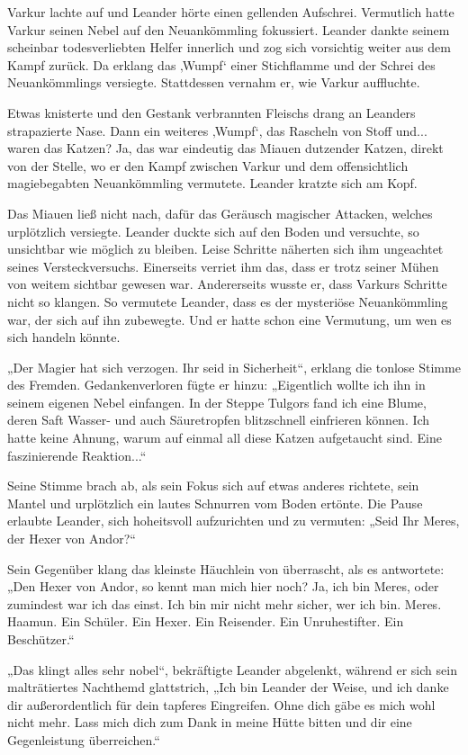 Varkur lachte auf und Leander hörte einen gellenden Aufschrei. Vermutlich hatte Varkur seinen Nebel auf den Neuankömmling fokussiert. Leander dankte seinem scheinbar todesverliebten Helfer innerlich und zog sich vorsichtig weiter aus dem Kampf zurück. Da erklang das ‚Wumpf‘ einer Stichflamme und der Schrei des Neuankömmlings versiegte. Stattdessen vernahm er, wie Varkur auffluchte.

Etwas knisterte und den Gestank verbrannten Fleischs drang an Leanders strapazierte Nase. Dann ein weiteres ‚Wumpf‘, das Rascheln von Stoff und... waren das Katzen? Ja, das war eindeutig das Miauen dutzender Katzen, direkt von der Stelle, wo er den Kampf zwischen Varkur und dem offensichtlich magiebegabten Neuankömmling vermutete. Leander kratzte sich am Kopf.

Das Miauen ließ nicht nach, dafür das Geräusch magischer Attacken, welches urplötzlich versiegte. Leander duckte sich auf den Boden und versuchte, so unsichtbar wie möglich zu bleiben. Leise Schritte näherten sich ihm ungeachtet seines Versteckversuchs. Einerseits verriet ihm das, dass er trotz seiner Mühen von weitem sichtbar gewesen war. Andererseits wusste er, dass Varkurs Schritte nicht so klangen. So vermutete Leander, dass es der mysteriöse Neuankömmling war, der sich auf ihn zubewegte. Und er hatte schon eine Vermutung, um wen es sich handeln könnte.

„Der Magier hat sich verzogen. Ihr seid in Sicherheit“, erklang die tonlose Stimme des Fremden. Gedankenverloren fügte er hinzu: „Eigentlich wollte ich ihn in seinem eigenen Nebel einfangen. In der Steppe Tulgors fand ich eine Blume, deren Saft Wasser- und auch Säuretropfen blitzschnell einfrieren können. Ich hatte keine Ahnung, warum auf einmal all diese Katzen aufgetaucht sind. Eine faszinierende Reaktion...“

Seine Stimme brach ab, als sein Fokus sich auf etwas anderes richtete, sein Mantel und urplötzlich ein lautes Schnurren vom Boden ertönte. Die Pause erlaubte Leander, sich hoheitsvoll aufzurichten und zu vermuten: „Seid Ihr Meres, der Hexer von Andor?“

Sein Gegenüber klang das kleinste Häuchlein von überrascht, als es antwortete: „Den Hexer von Andor, so kennt man mich hier noch? Ja, ich bin Meres, oder zumindest war ich das einst. Ich bin mir nicht mehr sicher, wer ich bin. Meres. Haamun. Ein Schüler. Ein Hexer. Ein Reisender. Ein Unruhestifter. Ein Beschützer.“

„Das klingt alles sehr nobel“, bekräftigte Leander abgelenkt, während er sich sein malträtiertes Nachthemd glattstrich, „Ich bin Leander der Weise, und ich danke dir außerordentlich für dein tapferes Eingreifen. Ohne dich gäbe es mich wohl nicht mehr. Lass mich dich zum Dank in meine Hütte bitten und dir eine Gegenleistung überreichen.“

